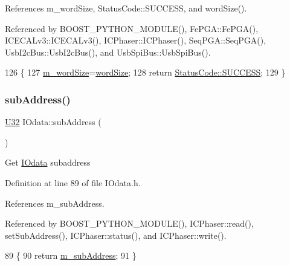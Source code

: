 References m\+\_\+word\+Size, Status\+Code\+::\+S\+U\+C\+C\+E\+SS, and word\+Size().



Referenced by B\+O\+O\+S\+T\+\_\+\+P\+Y\+T\+H\+O\+N\+\_\+\+M\+O\+D\+U\+L\+E(), Fe\+P\+G\+A\+::\+Fe\+P\+G\+A(), I\+C\+E\+C\+A\+Lv3\+::\+I\+C\+E\+C\+A\+Lv3(), I\+C\+Phaser\+::\+I\+C\+Phaser(), Seq\+P\+G\+A\+::\+Seq\+P\+G\+A(), Usb\+I2c\+Bus\+::\+Usb\+I2c\+Bus(), and Usb\+Spi\+Bus\+::\+Usb\+Spi\+Bus().


\begin{DoxyCode}
126                                                  \{
127     \hyperlink{classIOdata_a719b0ce607ada4fa91b12d6ecfa1b4c9}{m\_wordSize}=\hyperlink{classIOdata_a91f9e8b4095ca8365a824e43be36b143}{wordSize};
128     \textcolor{keywordflow}{return} \hyperlink{classStatusCode_a6f565cbeadc76d14c72f047e5e85eb4badd0da38d3ba0d922efd1f4619bc37ad8}{StatusCode::SUCCESS};
129   \}
\end{DoxyCode}
\mbox{\label{classIOdata_a25df48b84364a468373260f823ed9c5f}} 
\subsubsection{\texorpdfstring{sub\+Address()}{subAddress()}}
{\footnotesize\ttfamily \hyperlink{classIOdata_a96fb57f5fcd87b708743abd3c86a5198}{U32} I\+Odata\+::sub\+Address (\begin{DoxyParamCaption}{ }\end{DoxyParamCaption})\hspace{0.3cm}{\ttfamily [inline]}}

Get \hyperlink{classIOdata}{I\+Odata} subaddress 

Definition at line 89 of file I\+Odata.\+h.



References m\+\_\+sub\+Address.



Referenced by B\+O\+O\+S\+T\+\_\+\+P\+Y\+T\+H\+O\+N\+\_\+\+M\+O\+D\+U\+L\+E(), I\+C\+Phaser\+::read(), set\+Sub\+Address(), I\+C\+Phaser\+::status(), and I\+C\+Phaser\+::write().


\begin{DoxyCode}
89                   \{
90     \textcolor{keywordflow}{return} \hyperlink{classIOdata_a562f84e5cace1e392f1b0fca553fff78}{m\_subAddress};
91   \}
\end{DoxyCode}
\mbox{\label{classObject_a73a0f1a41828fdd8303dd662446fb6c3}} 
